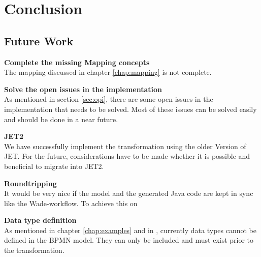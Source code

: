 \chapter{Conclusion}
\label{chap:conclusion}

\section{Future Work}

\textbf{Complete the missing Mapping concepts}\\
The mapping discussed in chapter \ref{chap:mapping} is not complete. 

\textbf{Solve the open issues in the implementation}\\
As mentioned in section \ref{sec:opi}, there are some open issues in the implementation that needs to be solved. Most of these issues can be solved easily and should be done in a near future. 

\textbf{JET2}\\
We have successfully implement the transformation using the older Version of JET. For the future, considerations have to be made whether it is possible and beneficial to migrate into JET2. 

\textbf{Roundtripping}\\
It would be very nice if the model and the generated Java code are kept in sync like the Wade-workflow. To achieve this on

\textbf{Data type definition}\\
As mentioned in chapter \ref{chap:examples} and in \cite{TKMLAH2010}, currently data types cannot be defined in the BPMN model. They can only be included and must exist prior to the transformation. 
